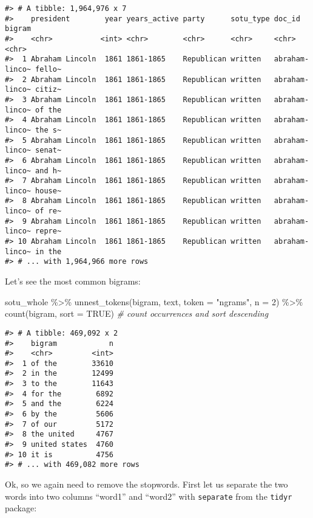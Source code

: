 \documentclass[
]{book}
\newenvironment{Shaded}{\begin{snugshade}}{\end{snugshade}}
\newcommand{\AttributeTok}[1]{\textcolor[rgb]{0.77,0.63,0.00}{#1}}
\newcommand{\CommentTok}[1]{\textcolor[rgb]{0.56,0.35,0.01}{\textit{#1}}}
\newcommand{\ConstantTok}[1]{\textcolor[rgb]{0.00,0.00,0.00}{#1}}
\newcommand{\DecValTok}[1]{\textcolor[rgb]{0.00,0.00,0.81}{#1}}
\newcommand{\FunctionTok}[1]{\textcolor[rgb]{0.00,0.00,0.00}{#1}}
\newcommand{\NormalTok}[1]{#1}
\newcommand{\SpecialCharTok}[1]{\textcolor[rgb]{0.00,0.00,0.00}{#1}}
\newcommand{\StringTok}[1]{\textcolor[rgb]{0.31,0.60,0.02}{#1}}
\begin{document}
\begin{verbatim}
#> # A tibble: 1,964,976 x 7
#>    president        year years_active party      sotu_type doc_id         bigram
#>    <chr>           <int> <chr>        <chr>      <chr>     <chr>          <chr> 
#>  1 Abraham Lincoln  1861 1861-1865    Republican written   abraham-linco~ fello~
#>  2 Abraham Lincoln  1861 1861-1865    Republican written   abraham-linco~ citiz~
#>  3 Abraham Lincoln  1861 1861-1865    Republican written   abraham-linco~ of the
#>  4 Abraham Lincoln  1861 1861-1865    Republican written   abraham-linco~ the s~
#>  5 Abraham Lincoln  1861 1861-1865    Republican written   abraham-linco~ senat~
#>  6 Abraham Lincoln  1861 1861-1865    Republican written   abraham-linco~ and h~
#>  7 Abraham Lincoln  1861 1861-1865    Republican written   abraham-linco~ house~
#>  8 Abraham Lincoln  1861 1861-1865    Republican written   abraham-linco~ of re~
#>  9 Abraham Lincoln  1861 1861-1865    Republican written   abraham-linco~ repre~
#> 10 Abraham Lincoln  1861 1861-1865    Republican written   abraham-linco~ in the
#> # ... with 1,964,966 more rows
\end{verbatim}

Let's see the most common bigrams:

\begin{Shaded}
\begin{Highlighting}[]
\NormalTok{sotu\_whole }\SpecialCharTok{\%\textgreater{}\%}
  \FunctionTok{unnest\_tokens}\NormalTok{(bigram, text, }\AttributeTok{token =} \StringTok{"ngrams"}\NormalTok{, }\AttributeTok{n =} \DecValTok{2}\NormalTok{) }\SpecialCharTok{\%\textgreater{}\%} 
  \FunctionTok{count}\NormalTok{(bigram, }\AttributeTok{sort =} \ConstantTok{TRUE}\NormalTok{) }\CommentTok{\# count occurrences and sort descending}
\end{Highlighting}
\end{Shaded}

\begin{verbatim}
#> # A tibble: 469,092 x 2
#>    bigram            n
#>    <chr>         <int>
#>  1 of the        33610
#>  2 in the        12499
#>  3 to the        11643
#>  4 for the        6892
#>  5 and the        6224
#>  6 by the         5606
#>  7 of our         5172
#>  8 the united     4767
#>  9 united states  4760
#> 10 it is          4756
#> # ... with 469,082 more rows
\end{verbatim}

Ok, so we again need to remove the stopwords. First let us separate the two words into two columns ``word1'' and ``word2'' with \texttt{separate} from the \texttt{tidyr} package:
\end{document}
